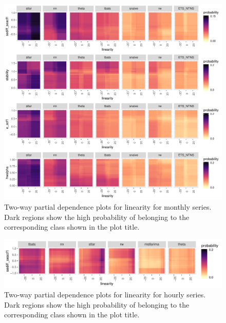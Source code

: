 \documentclass[11pt,a4paper,]{article}
\begin{document}
\begin{figure}[h]

{\centering \includegraphics[width=\textwidth]{figure/m2dpdp-1} 

}

\caption{Two-way partial dependence plots for linearity for monthly series. Dark regions show the high probability of belonging to the corresponding class shown in the plot title.}\label{fig:m2dpdp}
\end{figure}

\begin{figure}[h]

{\centering \includegraphics[width=\textwidth]{figure/h2dpdp-1} 

}

\caption{Two-way partial dependence plots for linearity for hourly series. Dark regions show the high probability of belonging to the corresponding class shown in the plot title.}\label{fig:h2dpdp}
\end{figure}
\end{document}
